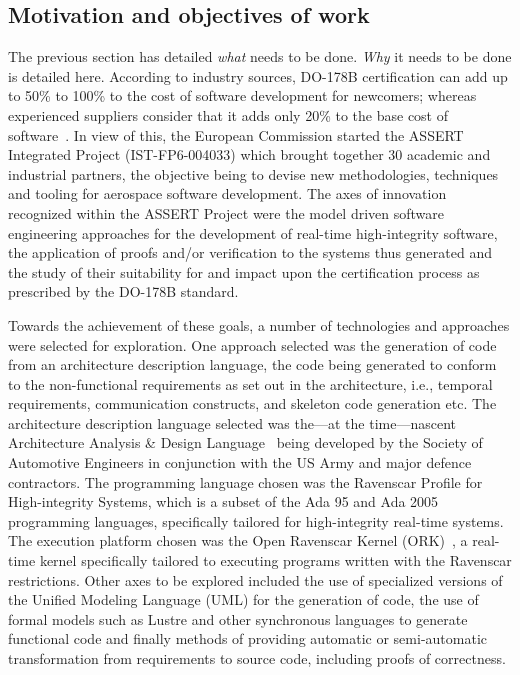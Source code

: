 \subsection{Motivation and objectives of work}
The previous section has detailed \emph{what} needs to be
done. \emph{Why} it needs to be done is detailed here. According to
industry sources, DO-178B certification can add up to 50\% to 100\% to
the cost of software development for newcomers; whereas experienced
suppliers consider that it adds only 20\% to the base cost of
software~\cite{do178b-cost}. In view of this, the European Commission
started the ASSERT Integrated Project (IST-FP6-004033) which brought
together 30 academic and industrial partners, the objective being to
devise new methodologies, techniques and tooling for aerospace
software development. The axes of innovation recognized within the
ASSERT Project were the model driven software engineering approaches
for the development of real-time high-integrity software, the
application of proofs and/or verification to the systems thus
generated and the study of their suitability for and impact upon the
certification process as prescribed by the DO-178B standard.

Towards the achievement of these goals, a number of technologies and
approaches were selected for exploration. One approach selected was
the generation of code from an architecture description language, the
code being generated to conform to the non-functional requirements as
set out in the architecture, i.e., temporal requirements,
communication constructs, and skeleton code generation etc. The
architecture description language selected was the---at the
time---nascent Architecture Analysis \& Design Language~\cite{AS5506}
being developed by the Society of Automotive Engineers in conjunction
with the US Army and major defence contractors. The programming
language chosen was the Ravenscar Profile for High-integrity Systems,
which is a subset of the Ada 95 and Ada 2005 programming languages,
specifically tailored for high-integrity real-time systems. The
execution platform chosen was the Open Ravenscar Kernel
(ORK)~\cite{puente@ae00}, a real-time kernel specifically tailored to
executing programs written with the Ravenscar restrictions. Other axes
to be explored included the use of specialized versions of the Unified
Modeling Language (UML) for the generation of code, the use of formal
models such as Lustre and other synchronous languages to generate
functional code and finally methods of providing automatic or
semi-automatic transformation from requirements to source code,
including proofs of correctness.

